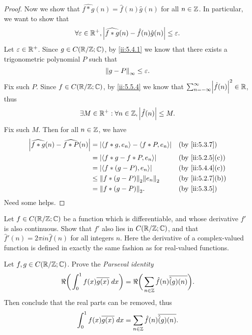 \begin{proof}
  Now we show that \(\widehat{f * g}(n) = \hat{f}(n) \hat{g}(n)\) for all \(n \in \Z\).
  In particular, we want to show that
  \[
    \forall \varepsilon \in \R^+, \abs{\widehat{f * g}(n) - \hat{f}(n) \hat{g}(n)} \leq \varepsilon.
  \]
  Let \(\varepsilon \in \R^+\).
  Since \(g \in C(\R / \Z ; \C)\), by \cref{ii:5.4.1} we know that there exists a trigonometric polynomial \(P\) such that
  \[
    \norm*{g - P}_{\infty} \leq \varepsilon.
  \]
  Fix such \(P\).
  Since \(f \in C(\R / \Z ; \C)\), by \cref{ii:5.5.4} we know that \(\sum_{n = -\infty}^\infty \abs{\hat{f}(n)}^2 \in \R\), thus
  \[
    \exists M \in \R^+ : \forall n \in \Z, \abs{\hat{f}(n)} \leq M.
  \]
  Fix such \(M\).
  Then for all \(n \in \Z\), we have
  \begin{align*}
    \abs{\widehat{f * g}(n) - \widehat{f * P}(n)} & = \abs{\inner*{f * g, e_n} - \inner*{f * P, e_n}} &  & \by{ii:5.3.7}    \\
                                                  & = \abs{\inner*{f * g - f * P, e_n}}               &  & \by{ii:5.2.5}[c] \\
                                                  & = \abs{\inner*{f * (g - P), e_n}}                 &  & \by{ii:5.4.4}[c] \\
                                                  & \leq \norm*{f * (g - P)}_2 \norm*{e_n}_2          &  & \by{ii:5.2.7}[b] \\
                                                  & = \norm*{f * (g - P)}_2.                          &  & \by{ii:5.3.5}
  \end{align*}
  Need some helps.
\end{proof}

\begin{ex}\label{ii:ex:5.5.4}
  Let \(f \in C(\R / \Z ; \C)\) be a function which is differentiable, and whose derivative \(f'\) is also continuous.
  Show that \(f'\) also lies in \(C(\R / \Z ; \C)\), and that \(\hat{f}'(n) = 2 \pi i n \hat{f}(n)\) for all integers \(n\).
  Here the derivative of a complex-valued function is defined in exactly the same fashion as for real-valued functions.
\end{ex}

\begin{ex}\label{ii:ex:5.5.5}
  Let \(f, g \in C(\R / \Z ; \C)\).
  Prove the \emph{Parseval identity}
  \[
    \Re\bigg(\int_0^1 f(x) \overline{g(x)} \; dx\bigg) = \Re\bigg(\sum_{n \in \Z} \hat{f}(n) \overline{\hat(g)(n)}\bigg).
  \]
  Then conclude that the real parts can be removed, thus
  \[
    \int_0^1 f(x) \overline{g(x)} \; dx = \sum_{n \in \Z} \hat{f}(n) \overline{\hat(g)(n)}.
  \]
\end{ex}

